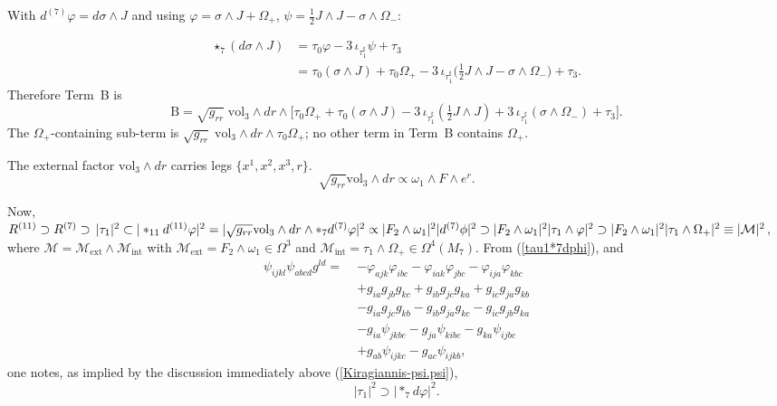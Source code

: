 \documentclass[a4paper,11pt,fleqn]{article}
\theoremstyle{plain}
\theoremstyle{definition}
\newcommand{\vp}{\varphi}
\newcommand{\ps}{\psi}
\newcommand{\ta}{\tau}
\newcommand{\vthree}{\mathrm{vol}_3}
\newcommand{\grr}{g_{rr}}
\newcommand{\iot}[1]{\iota_{#1}}
\newcommand{\str}{\star_7}
\begin{document}
With $d^{(7)}\vp = d\sigma\wedge J$ and using
$\vp = \sigma\wedge J+\Omega_+$, $\ps = \tfrac{1}{2}J\wedge J-\sigma\wedge\Omega_-$:

\begin{align*}
  \str(d\sigma\wedge J)
  &= \ta_0\vp - 3\,\iot{\ta_1^\sharp}\ps + \ta_3 \\
  &= \ta_0(\sigma\wedge J) + \ta_0\Omega_+
     - 3\,\iot{\ta_1^\sharp}\bigl(\tfrac{1}{2}J\wedge J - \sigma\wedge\Omega_-\bigr)
     + \ta_3.
\end{align*}
Therefore Term~B is
\[
  \text{B}
  = \sqrt{\grr}\;\vthree\wedge dr\wedge
    \bigl[
      \ta_0\Omega_+
      + \ta_0(\sigma\wedge J)
      - 3\,\iot{\ta_1^\sharp}(\tfrac{1}{2}J\wedge J)
      + 3\,\iot{\ta_1^\sharp}(\sigma\wedge\Omega_-)
      + \ta_3
    \bigr].
\]
The $\Omega_+$-containing sub-term is $\sqrt{\grr}\;\vthree\wedge dr\wedge\ta_0\Omega_+$;
no other term in Term~B contains $\Omega_+$.

The external factor $\vthree\wedge dr$ carries legs $\{x^1,x^2,x^3,r\}$.
\[
  \sqrt{\grr}\vthree\wedge dr\propto
  \omega_1\wedge F\wedge e^r.
\]

Now, $R^{(11)}\supset   R^{(7)}\supset \,|\tau_1|^2\subset|*_{11}d^{(11)}\varphi|^2=| \sqrt{\grr}\vthree\wedge dr\wedge*_7d^{(7)}\varphi|^2\propto  |F_2\wedge\omega_1|^2|d^{(7)}\phi|^2\supset|F_2\wedge\omega_1|^2|\tau_1\wedge\varphi|^2\supset |F_2\wedge\omega_1|^2 |\tau_1\wedge\Omega_+|^2\equiv|{\cal M}|^2$,
where $\mathcal{M}=\mathcal{M}_{\mathrm{ext}}\wedge\mathcal{M}_{\mathrm{int}}$
with $\mathcal{M}_{\mathrm{ext}}=F_2\wedge\omega_1\in\Omega^3$ and
$\mathcal{M}_{\mathrm{int}}=\ta_1\wedge\Omega_+\in\Omega^4(M_7)$. From (\ref{tau1*7dphi}), and \cite{Karigiannis}
\begin{equation}
\label{Kiragiannis-psi.psi}
\begin{aligned}
\psi_{ijkl}\psi_{abcd}g^{ld} = \;&
  -\varphi_{ajk}\varphi_{ibc}
  - \varphi_{iak}\varphi_{jbc}
  - \varphi_{ija}\varphi_{kbc} \\
&+ g_{ia}g_{jb}g_{kc}
  + g_{ib}g_{jc}g_{ka}
  + g_{ic}g_{ja}g_{kb} \\
&- g_{ia}g_{jc}g_{kb}
  - g_{ib}g_{ja}g_{kc}
  - g_{ic}g_{jb}g_{ka} \\
&- g_{ia}\psi_{jkbc}
  - g_{ja}\psi_{kibc}
  - g_{ka}\psi_{ijbc} \\
&+ g_{ab}\psi_{ijkc}
  - g_{ac}\psi_{ijkb},
\end{aligned}
\end{equation}
one notes, as implied by the discussion immediately above (\ref{Kiragiannis-psi.psi}),
\begin{equation*}
|\tau_1|^2\supset |*_7d\varphi|^2.
\end{equation*}
\end{document}
